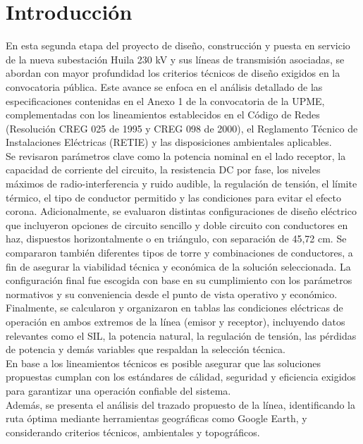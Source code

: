 \section{Introducción}
En esta segunda etapa del proyecto de diseño, construcción y puesta en servicio de la nueva subestación Huila 230 kV y sus líneas de transmisión asociadas, se abordan con mayor profundidad los criterios técnicos de diseño exigidos en la convocatoria pública. Este avance se enfoca en el análisis detallado de las especificaciones contenidas en el Anexo 1 de la convocatoria de la UPME, complementadas con los lineamientos establecidos en el Código de Redes (Resolución CREG 025 de 1995 y CREG 098 de 2000), el Reglamento Técnico de Instalaciones Eléctricas (RETIE) y las disposiciones ambientales aplicables.\\ Se revisaron parámetros clave como la potencia nominal en el lado receptor, la capacidad de corriente del circuito, la resistencia DC por fase, los niveles máximos de radio-interferencia y ruido audible, la regulación de tensión, el límite térmico, el tipo de conductor permitido y las condiciones para evitar el efecto corona. Adicionalmente, se evaluaron distintas configuraciones de diseño eléctrico que incluyeron opciones de circuito sencillo y doble circuito con conductores en haz, dispuestos horizontalmente o en triángulo, con separación de 45,72 cm. Se compararon también diferentes tipos de torre y combinaciones de conductores, a fin de asegurar la viabilidad técnica y económica de la solución seleccionada. La configuración final fue escogida con base en su cumplimiento con los parámetros normativos y su conveniencia desde el punto de vista operativo y económico. Finalmente, se calcularon y organizaron en tablas las condiciones eléctricas de operación en ambos extremos de la línea (emisor y receptor), incluyendo datos relevantes como el SIL, la potencia natural, la regulación de tensión, las pérdidas de potencia y demás variables que respaldan la selección técnica.\\ En base a los lineamientos técnicos es posible asegurar que las soluciones propuestas cumplan con los estándares de cálidad, seguridad y eficiencia exigidos para garantizar una operación confiable del sistema. \\Además, se presenta el análisis del trazado propuesto de la línea, identificando la ruta óptima mediante herramientas geográficas como Google Earth, y considerando criterios técnicos, ambientales y topográficos. 




